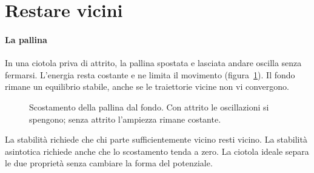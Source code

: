 \documentclass[11pt,a4paper,twoside=false,headinclude,footinclude]{scrartcl}
\begin{document}
\section{Restare vicini}\label{sec:vicini}

\paragraph{La pallina} In una ciotola priva di attrito, la pallina spostata e lasciata andare oscilla senza fermarsi. L'energia resta costante e ne limita il movimento (figura~\ref{fig:duegrafici}). Il fondo rimane un equilibrio stabile, anche se le traiettorie vicine non vi convergono.

\begin{figure}[htbp]
\centering
{}
\caption{Scostamento della pallina dal fondo. Con attrito le oscillazioni si spengono; senza attrito l'ampiezza rimane costante.}
\label{fig:duegrafici}
\end{figure}

La stabilità richiede che chi parte sufficientemente vicino resti vicino. La stabilità asintotica richiede anche che lo scostamento tenda a zero. La ciotola ideale separa le due proprietà senza cambiare la forma del potenziale.
\end{document}

